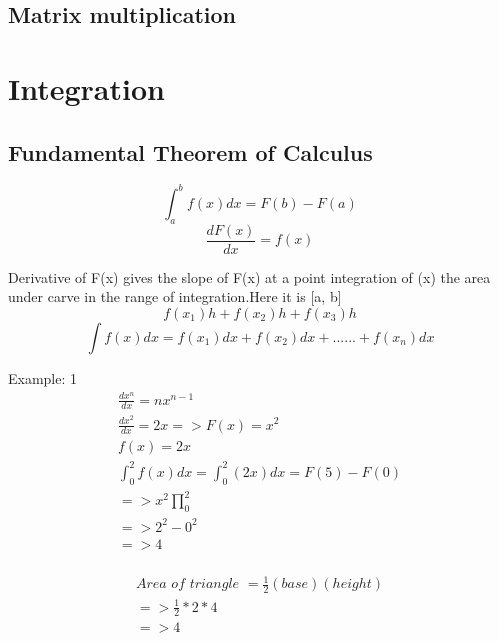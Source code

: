 \subsection{Matrix multiplication}






\section{Integration}




\subsection{Fundamental Theorem of Calculus}

\begin{equation}
	\int_{a}^{b}f(x)dx=F(b)-F(a)
\end{equation}
\begin{equation}
	\frac{dF(x)}{dx}=f(x)
\end{equation}

	Derivative of F(x) gives the slope of F(x) at a point integration of (x) the area under carve in the range of integration.Here it is [a, b]
\newline
\begin{equation}
	f(x_1)h+f(x_2)h+f(x_3)h
\end{equation}
\begin{equation}
	\int f(x)dx=f(x_1)dx+f(x_2)dx+......+f(x_n)dx
\end{equation}

Example: 1
\begin{align}
	\frac{dx^n}{dx} = nx^{n-1} \\
	\frac{dx^2}{dx} = 2x => F(x)=x^2 \\
	f(x) = 2x \\
	\int_{0}^{2}f(x)dx=\int_{0}^{2}(2x)dx = F(5)-F(0) \\
	=> x^2\prod_{0}^{2} \\
	=>2^2-0^2 \\
	=>4 \\
\end{align}

\begin{align}
	Area \,\, of \,\, triangle\,\, = \frac{1}{2}(base)(height) \\
	=>\frac{1}{2}*2*4 \\
	=> 4 \\
\end{align}


